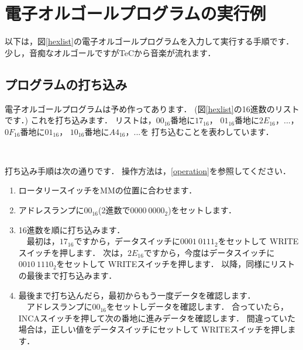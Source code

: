 \renewcommand{\myepsfbox}[1]{\epsfbox{appA/#1}}

\chapter{電子オルゴールプログラムの実行例}
以下は，図\ref{hexlist}の電子オルゴールプログラムを入力して実行する手順です．
少し，音痴なオルゴールですがTeCから音楽が流れます．

\section{プログラムの打ち込み}
電子オルゴールプログラムは予め作ってあります．
(図\ref{hexlist}の16進数のリストです．)
これを打ち込みます．
リストは，$00_{16}$番地に$17_{16}$，
$01_{16}$番地に$2E_{16}$，...，$0F_{16}$番地に$01_{16}$，
$10_{16}$番地に$A4_{16}$，...を
打ち込むことを表わしています．

\begin{figure*}[btph]
\begin{center}
\epsfxsize=15cm
\myepsfbox{doremi.pdf} \\
\caption{電子オルゴールプログラムの16進数リスト}
\label{hexlist}
\end{center}
\end{figure*}

打ち込み手順は次の通りです．
操作方法は，\ref{operation}を参照してください．
\begin{enumerate}
\item ロータリースイッチをMMの位置に合わせます．
\item アドレスランプに$00_{16}$(2進数で$0000~0000_{2}$)をセットします．
\item 16進数を順に打ち込みます．\\
　最初は，$17_{16}$ですから，データスイッチに$0001~0111_{2}$をセットして
WRITEスイッチを押します．
次は，$2E_{16}$ですから，今度はデータスイッチに$0010~1110_{2}$をセットして
WRITEスイッチを押します．
以降，同様にリストの最後まで打ち込みます．
\item 最後まで打ち込んだら，最初からもう一度データを確認します．\\
　アドレスランプに$00_{16}$をセットしデータを確認します．
合っていたら，INCAスイッチを押して次の番地に進みデータを確認します．
間違っていた場合は，正しい値をデータスイッチにセットして
WRITEスイッチを押します．
\end{enumerate}

